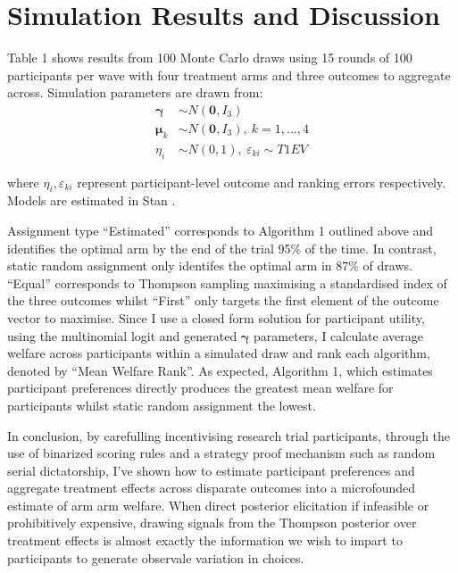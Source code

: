 \documentclass[twoside,11pt]{article}
\begin{document}
 
\section*{Simulation Results and Discussion}


Table 1 shows results from 100 Monte Carlo draws using 15 rounds of 100 
participants per wave with four treatment arms and three outcomes to 
aggregate across. Simulation parameters are drawn from:
\begin{align*}
  \bm{\gamma} &\sim N(\bm{0}, I_3) \\
  \bm{\mu}_k &\sim N(\bm{0}, I_3), \ k = 1, ..., 4 \\
  \eta_i &\sim N(0, 1),\ \varepsilon_{ki} \sim T1EV
\end{align*}

where $\eta_i, \varepsilon_{ki}$ represent participant-level outcome and 
ranking errors respectively. Models are estimated in Stan \citep{carpenter2017a}.

Assignment type ``Estimated'' corresponds to Algorithm 1 outlined above and 
identifies the optimal arm by the end of the trial 95\% of the time. In contrast, 
static random assignment only identifes the optimal arm in 87\% of draws. ``Equal''
corresponds to Thompson sampling maximising a standardised index of the three 
outcomes whilst ``First'' only targets the first element of the outcome vector to 
maximise. Since I use a closed form solution for participant utility, using the 
multinomial logit and generated $\bm{\gamma}$ parameters, I calculate average 
welfare across participants within a simulated draw and rank each algorithm, 
denoted by ``Mean Welfare Rank''. As expected, Algorithm 1, which estimates 
participant preferences directly produces the greatest mean welfare for participants 
whilst static random assignment the lowest.

In conclusion, by carefulling incentivising research trial participants, through the 
use of binarized scoring rules and a strategy proof mechanism such as 
random serial dictatorship, I've shown how to estimate participant preferences
and aggregate treatment effects across disparate outcomes into a microfounded 
estimate of arm arm welfare. When direct posterior elicitation if infeasible or 
prohibitively expensive, drawing signals from the Thompson posterior over treatment 
effects is almost exactly the information we wish to impart to participants 
to generate observale variation in choices.



\newpage


\vskip 0.2in

\end{document}
